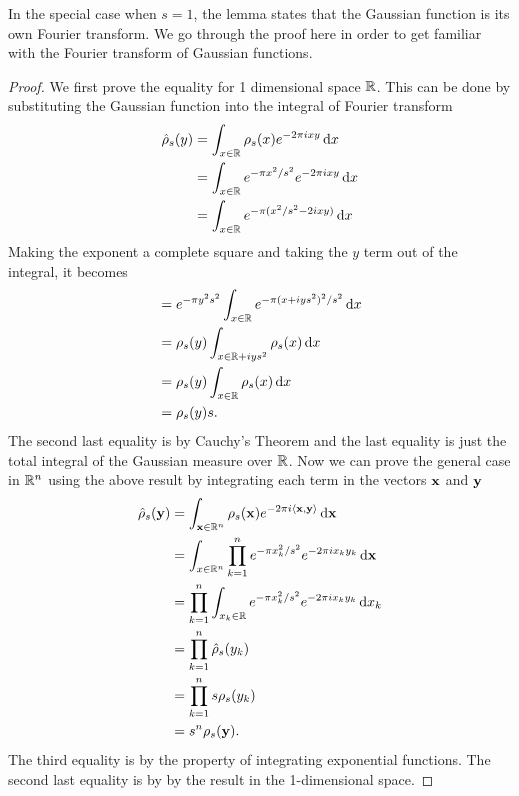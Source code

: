 \documentclass[../main.tex]{subfiles}
\begin{document}
In the special case when $s=1$, the lemma states that the Gaussian function is its own Fourier transform. We go through the proof here in order to get familiar with the Fourier transform of Gaussian functions. 

\begin{proof}
We first prove the equality for 1 dimensional space $\mathbb{R}$. This can be done by substituting the Gaussian function into the integral of Fourier transform 
\begin{align*}
    \hat{\rho}_{s}(y) &= \int_{x \in \mathbb{R}} \rho_{s}(x) e^{-2\pi i x y} \mathop{}\!\mathrm{d} x \\
    &= \int_{x \in \mathbb{R}} e^{-\pi x^2/s^2} e^{-2\pi i x y} \mathop{}\!\mathrm{d} x \\
    &= \int_{x \in \mathbb{R}} e^{-\pi( x^2/s^2-2 i x y)} \mathop{}\!\mathrm{d} x 
\end{align*}
Making the exponent a complete square and taking the $y$ term out of the integral, it becomes 
\begin{align*}
    &= e^{-\pi y^2 s^2} \int_{x \in \mathbb{R}} e^{-\pi( x+iys^2)^2/s^2} \mathop{}\!\mathrm{d} x \\
    &= \rho_s(y) \int_{x \in \mathbb{R}+iys^2} \rho_s(x) \mathop{}\!\mathrm{d} x \\
    &= \rho_s(y) \int_{x \in \mathbb{R}} \rho_s(x) \mathop{}\!\mathrm{d} x \\
    &= \rho_s(y) s.
\end{align*}
The second last equality is by Cauchy's Theorem and the last equality is just the total integral of the Gaussian measure over $\mathbb{R}$.
Now we can prove the general case in $\mathbb{R}^n$ using the above result by integrating each term in the vectors $\mathbf{x}$ and $\mathbf{y}$ 
\begin{align*}
    \hat{\rho}_{s}(\mathbf{y}) &= \int_{\mathbf{x} \in \mathbb{R}^n} \rho_{s}(\mathbf{x}) e^{-2\pi i \langle \mathbf{x}, \mathbf{y}\rangle} \mathop{}\!\mathrm{d} \mathbf{x} \\
    &= \int_{x \in \mathbb{R}^n} \prod_{k=1}^n e^{-\pi x_k^2/s^2} e^{-2\pi i x_k y_k} \mathop{}\!\mathrm{d}  \mathbf{x}\\
    &= \prod_{k=1}^n \int_{x_k \in \mathbb{R}}  e^{-\pi x_k^2/s^2} e^{-2\pi i x_k y_k} \mathop{}\!\mathrm{d}  x_k\\
    &= \prod_{k=1}^n \hat{\rho}_s(y_k) \\
    &= \prod_{k=1}^n s \rho_s(y_k) \\
    &= s^n \rho_s(\mathbf{y}).
\end{align*}
The third equality is by the property of integrating exponential functions. The second last equality is by by the result in the 1-dimensional space.  
\end{proof}
\end{document}
